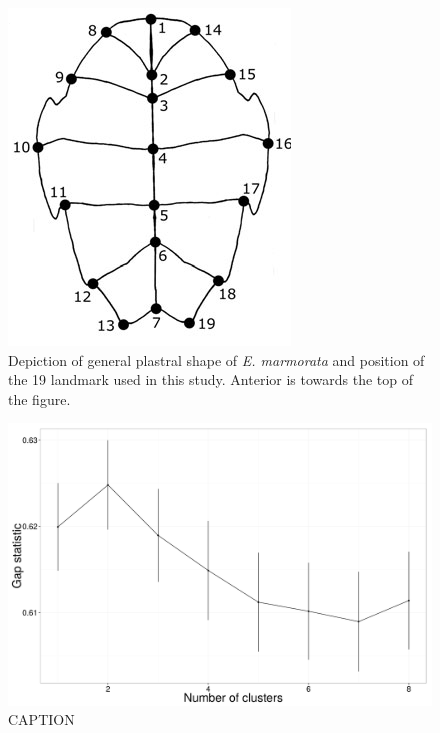 \documentclass[12pt,letterpaper]{article}
\begin{document}
\begin{figure}[ht]
  \centering
  \includegraphics[height = \textheight, width = \textwidth, keepaspectratio = true]{figure/plastra}
  \caption{Depiction of general plastral shape of \textit{E. marmorata} and position of the 19 landmark used in this study. Anterior is towards the top of the figure.}
  \label{fig:plastra}
\end{figure}

\begin{figure}[ht]
  \centering
  \includegraphics[height = \textheight, width = \textwidth, keepaspectratio = true]{figure/gap_res}
  \caption{CAPTION}
  \label{fig:gap}
\end{figure}
\end{document}
